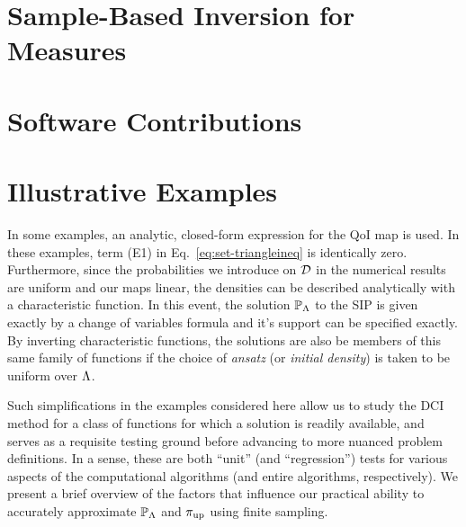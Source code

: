 \pagebreak
\section{Sample-Based Inversion for Measures}\label{sec:ch02-sample}


\FloatBarrier

\FloatBarrier

\FloatBarrier

\FloatBarrier



\section{Software Contributions}\label{sec:ch02-software}

\FloatBarrier

\section{Illustrative Examples}\label{sec:ch02-examples}
In some examples, an analytic, closed-form expression for the QoI map is used.
In these examples, term (E1) in Eq.~\eqref{eq:set-triangleineq} is identically zero.
Furthermore, since the probabilities we introduce on $\mathcal{D}$ in the numerical results are uniform and our maps linear, the densities can be described analytically with a characteristic function.
In this event, the solution $\mathbb{P}_{\Lambda}$ to the SIP is given exactly by a change of variables formula and it's support can be specified exactly.
By inverting characteristic functions, the solutions are also be members of this same family of functions if the choice of \emph{ansatz} (or \emph{initial density}) is taken to be uniform over ${\Lambda}$.

Such simplifications in the examples considered here allow us to study the DCI method for a class of functions for which a solution is readily available, and serves as a requisite testing ground before advancing to more nuanced problem definitions.
In a sense, these are both ``unit'' (and ``regression'') tests for various aspects of the computational algorithms (and entire algorithms, respectively).
We present a brief overview of the factors that influence our practical ability to accurately approximate $\mathbb{P}_{\Lambda}$ and $\operatorname*{\pi_{up}}$ using finite sampling.

